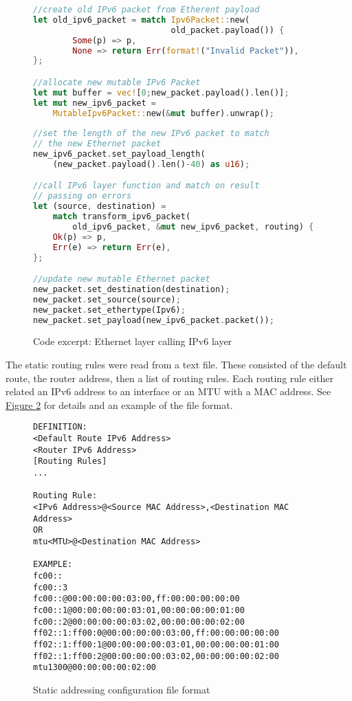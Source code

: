 \documentclass[12pt,a4paper,twoside,openany]{report}
\begin{document}
\begin{figure}
\centering
\begin{varwidth}{\linewidth}
\begin{lstlisting}[language=Rust]
//create old IPv6 packet from Etherent payload
let old_ipv6_packet = match Ipv6Packet::new(
                            old_packet.payload()) {
        Some(p) => p,
        None => return Err(format!("Invalid Packet")),
};

//allocate new mutable IPv6 Packet
let mut buffer = vec![0;new_packet.payload().len()];
let mut new_ipv6_packet = 
    MutableIpv6Packet::new(&mut buffer).unwrap();
    
//set the length of the new IPv6 packet to match
// the new Ethernet packet
new_ipv6_packet.set_payload_length(
    (new_packet.payload().len()-40) as u16);

//call IPv6 layer function and match on result
// passing on errors
let (source, destination) = 
    match transform_ipv6_packet(
        old_ipv6_packet, &mut new_ipv6_packet, routing) {
    Ok(p) => p,
    Err(e) => return Err(e),
};

//update new mutable Ethernet packet
new_packet.set_destination(destination);
new_packet.set_source(source);
new_packet.set_ethertype(Ipv6);
new_packet.set_payload(new_ipv6_packet.packet());
\end{lstlisting}
\end{varwidth}
\caption{Code excerpt: Ethernet layer calling IPv6 layer}
\label{fig::mutability}
\end{figure}

\bigskip

The static routing rules were read from a text file. These consisted of the default route, the router address, then a list of routing rules.  Each routing rule either related an IPv6 address to an interface or an MTU with a MAC address. See \hyperref[fig::config_file]{Figure }\ref{fig::config_file} for details and an example of the file format. 

\begin{figure}
\begin{varwidth}{\linewidth}
\begin{verbatim}
DEFINITION:
<Default Route IPv6 Address>
<Router IPv6 Address>
[Routing Rules]
...

Routing Rule:
<IPv6 Address>@<Source MAC Address>,<Destination MAC Address>
OR
mtu<MTU>@<Destination MAC Address>

EXAMPLE:
fc00::
fc00::3
fc00::@00:00:00:00:03:00,ff:00:00:00:00:00
fc00::1@00:00:00:00:03:01,00:00:00:00:01:00
fc00::2@00:00:00:00:03:02,00:00:00:00:02:00
ff02::1:ff00:0@00:00:00:00:03:00,ff:00:00:00:00:00
ff02::1:ff00:1@00:00:00:00:03:01,00:00:00:00:01:00
ff02::1:ff00:2@00:00:00:00:03:02,00:00:00:00:02:00
mtu1300@00:00:00:00:02:00
\end{verbatim}
\end{varwidth}
\caption{Static addressing configuration file format}
\label{fig::config_file}
\end{figure}
\end{document}
